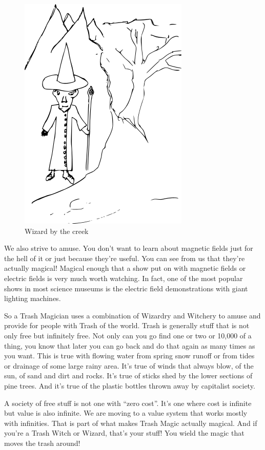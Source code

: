 \begin{figure}[htbp]
\centering
\includegraphics{images/wizardcartoon.png}
\caption{Wizard by the creek}
\end{figure}

We also strive to amuse. You don't want to learn about magnetic fields
just for the hell of it or just because they're useful. You can see from
us that they're actually magical! Magical enough that a show put on with
magnetic fields or electric fields is very much worth watching. In fact,
one of the most popular shows in most science museums is the electric
field demonstrations with giant lighting machines.

So a Trash Magician uses a combination of Wizardry and Witchery to amuse
and provide for people with Trash of the world. Trash is generally stuff
that is not only free but infinitely free. Not only can you go find one
or two or 10,000 of a thing, you know that later you can go back and do
that again as many times as you want. This is true with flowing water
from spring snow runoff or from tides or drainage of some large rainy
area. It's true of winds that always blow, of the sun, of sand and dirt
and rocks. It's true of sticks shed by the lower sections of pine trees.
And it's true of the plastic bottles thrown away by capitalist society.

A society of free stuff is not one with ``zero cost''. It's one where
cost is infinite but value is also infinite. We are moving to a value
system that works mostly with infinities. That is part of what makes
Trash Magic actually magical. And if you're a Trash Witch or Wizard,
that's your stuff! You wield the magic that moves the trash around!

